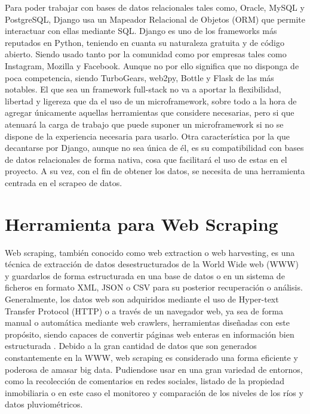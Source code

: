 Para poder trabajar con bases de datos relacionales tales como, Oracle, MySQL y PostgreSQL, Django usa un Mapeador Relacional de Objetos (ORM) que permite interactuar con ellas mediante SQL.\newline
\newline
Django es uno de los frameworks más reputados en Python, teniendo en cuanta su naturaleza gratuita y de código abierto. Siendo usado tanto por la comunidad como por empresas tales como Instagram, Mozilla y Facebook. Aunque no por ello significa que no disponga de poca competencia, siendo TurboGears, web2py, Bottle y Flask de las más notables.
\newline
\newline
El que sea un framework full-stack no va a aportar la flexibilidad, libertad y ligereza que da el uso de un microframework, sobre todo a la hora de agregar únicamente aquellas herramientas que considere necesarias, pero si que atenuará la carga de trabajo que puede suponer un microframework si no se dispone de la experiencia necesaria para usarlo.
\newline
\newline
Otra característica por la que decantarse por Django, aunque no sea única de él, es su compatibilidad con bases de datos relacionales de forma nativa, cosa que facilitará el uso de estas en el proyecto. A su vez, con el fin de obtener los datos, se necesita de una herramienta centrada en el scrapeo de datos.

\section{Herramienta para Web Scraping}
Web scraping, también conocido como web extraction o web harvesting, es una técnica de extracción de datos desestructurados de la World Wide web (WWW) y guardarlos de forma estructurada en una base de datos o en un sistema de ficheros en formato XML, JSON o CSV para su posterior recuperación o análisis. Generalmente, los datos web son adquiridos mediante el uso de Hyper-text Transfer Protocol (HTTP) o a través de un navegador web, ya sea de forma manual o automática mediante web crawlers, herramientas diseñadas con este propósito, siendo capaces de convertir páginas web enteras en información bien estructurada \cite{zhao2017web} \cite{krotov2018legality}.
\newline
\newline
Debido a la gran cantidad de datos que son generados constantemente en la WWW, web scraping es considerado una forma eficiente y poderosa de amasar big data. Pudiendose usar en una gran variedad de entornos, como la recolección de comentarios en redes sociales, listado de la propiedad inmobiliaria o en este caso el monitoreo y comparación de los niveles de los ríos y datos pluviométricos.

